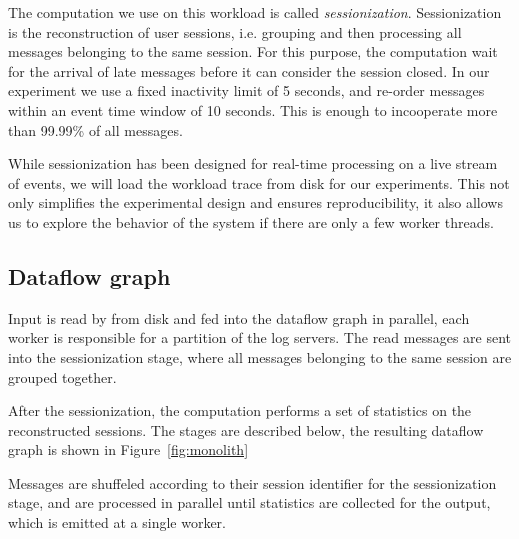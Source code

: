 The computation we use on this workload is called \emph{sessionization}. Sessionization
is the reconstruction of user sessions, i.e. grouping and then processing all
messages belonging to the same session. For this purpose, the computation wait for
the arrival of late messages before it can consider the session closed. In
our experiment we use a fixed inactivity limit of 5 seconds, and re-order messages
within an event time window of 10 seconds. This is enough to incooperate more
than 99.99\% of all messages. 

While sessionization has been designed for real-time processing on a live
stream of events, we will load the workload trace from disk for our experiments.
This not only simplifies the experimental design and ensures reproducibility,
it also allows us to explore the behavior of the system if there are only a
few worker threads.

\subsection{Dataflow graph}

Input is read by from disk and fed into the dataflow graph in parallel, each worker
is responsible for a partition of the log servers. The read messages are sent
into the sessionization stage, where all messages belonging to the same session
are grouped together.

After the sessionization, the computation performs a set of statistics on the
reconstructed sessions. The stages are described below, the resulting dataflow
graph is shown in Figure~\ref{fig:monolith}

Messages are shuffeled according to their session identifier for the
sessionization stage, and are processed in parallel until statistics are
collected for the output, which is emitted at a single worker. 

